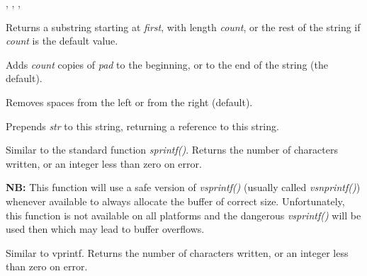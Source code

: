 
,
, ,

\label{wxstringmid}


Returns a substring starting at {\it first}, with length {\it count}, or the rest of
the string if {\it count} is the default value.

\label{wxstringpad}


Adds {\it count} copies of {\it pad} to the beginning, or to the end of the string (the default).

Removes spaces from the left or from the right (default).

\label{wxstringprepend}


Prepends {\it str} to this string, returning a reference to this string.

\label{wxstringprintf}


Similar to the standard function {\it sprintf()}. Returns the number of
characters written, or an integer less than zero on error.

{\bf NB:} This function will use a safe version of {\it vsprintf()} (usually called 
{\it vsnprintf()}) whenever available to always allocate the buffer of correct
size. Unfortunately, this function is not available on all platforms and the
dangerous {\it vsprintf()} will be used then which may lead to buffer overflows.

\label{wxstringprintfv}


Similar to vprintf. Returns the number of characters written, or an integer less than zero
on error.

\label{wxstringremove}

